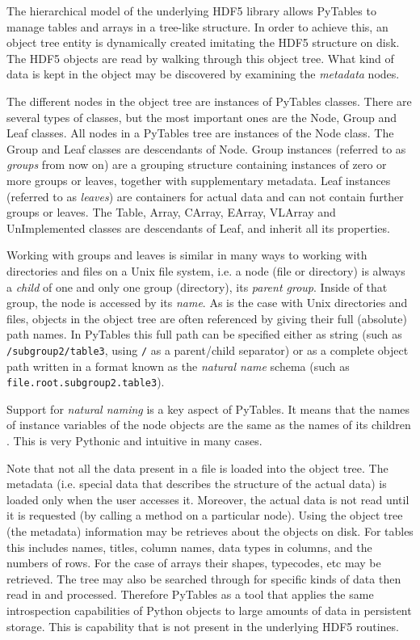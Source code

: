 The hierarchical model of the underlying HDF5 library allows
PyTables to manage tables and arrays in a tree-like structure. In
order to achieve this, an object tree entity is
dynamically created imitating the HDF5 structure
on disk. The HDF5 objects are read by walking through this object
tree. What kind of data is kept in the object may be discovered 
by examining the \emph{metadata} nodes.

The different nodes in the object tree are instances of PyTables
classes. There are several types of classes, but the most important
ones are the Node, Group and
Leaf classes. All nodes in a PyTables tree are
instances of the Node class. The
Group and Leaf classes are
descendants of Node. Group
instances (referred to as \emph{groups} from now on) are
a grouping structure containing instances of zero or more groups or
leaves, together with supplementary metadata. Leaf
instances (referred to as \emph{leaves}) are containers
for actual data and can not contain further groups or leaves. The
Table, Array,
CArray, EArray,
VLArray and UnImplemented
classes are descendants of Leaf, and inherit all
its properties.

Working with groups and leaves is similar in many ways to
working with directories and files on a Unix file system, i.e. a node
(file or directory) is always a \emph{child} of one and
only one group (directory), its \emph{parent group}.
Inside of that group, the node is accessed by its
\emph{name}. As is the case with Unix directories and
files, objects in the object tree are often referenced by giving their
full (absolute) path names. In PyTables this full path can be
specified either as string (such as
\texttt{/subgroup2/table3}, using \texttt{/} as
a parent/child separator) or as a complete object path written in a
format known as the \emph{natural name} schema (such as
\texttt{file.root.subgroup2.table3}).

Support for \emph{natural naming} is a key aspect
of PyTables. It means that the names of instance variables of the node
objects are the same as the names of its children \cite{Mertz2000}. 
This is very Pythonic and intuitive in many cases. 

Note that not all the data present in a file
is loaded into the object tree. The metadata
(i.e. special data that describes the structure of the actual data) is
loaded only when the user accesses it. Moreover,
the actual data is not read until it is requested (by calling a method
on a particular node). Using the object tree (the metadata)
information may be retrieves about the objects on disk.  For tables 
this includes names, titles, column names, data types in columns, and the numbers of rows.
For the case of arrays their shapes, typecodes, etc may be retrieved. 
The tree may also be searched through for specific kinds of data then read in and processed.
Therefore PyTables as a tool that
applies the same introspection capabilities of Python objects to large
amounts of data in persistent storage.  This is capability that is not
present in the underlying HDF5 routines.

